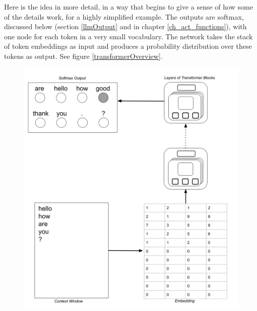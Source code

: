 Here is the idea in more detail, in a way that begins to give a sense of how some of the details work, for a highly simplified example. The outputs are softmax, discussed below (section \ref{llmOutput} and in chapter \ref{ch_act_functions}), with one node for each token in a very small vocabulary. The network takes the stack of token embeddings as input and produces a probability distribution over these tokens as output.  See figure \ref{transformerOverview}.

\begin{figure}[h]
\centering
\includegraphics[scale=.2]{./images/TransformerOverview.png} \; \; \; 

\end{figure}
